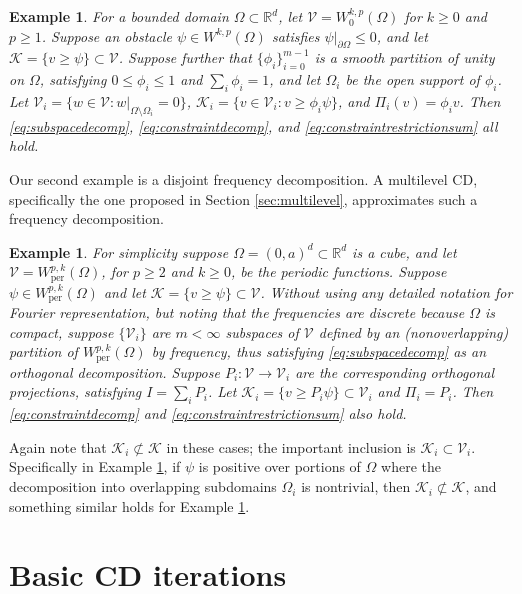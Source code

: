 \documentclass[letterpaper,final,12pt,reqno]{amsart}
\theoremstyle{cstyle}
\theoremstyle{cstyle*}
\theoremstyle{dstyle}
\newtheorem{example}[theorem]{Example}
\numberwithin{equation}{section}
\numberwithin{figure}{section}
\numberwithin{table}{section}
\numberwithin{theorem}{section}
\newcommand{\RR}{\mathbb{R}}
\newcommand{\cK}{\mathcal{K}}
\newcommand{\cV}{\mathcal{V}}
\begin{document}
\begin{example}  \label{ex:domaindecomposition}  For a bounded domain $\Omega \subset \RR^d$, let $\cV = W_0^{k,p}(\Omega)$ for $k\ge 0$ and $p\ge 1$.  Suppose an obstacle $\psi \in W^{k,p}(\Omega)$ satisfies $\psi|_{\partial \Omega} \le 0$, and let $\cK = \{v \ge \psi\} \subset \cV$.  Suppose further that $\{\phi_i\}_{i=0}^{m-1}$ is a smooth partition of unity on $\Omega$, satisfying $0 \le \phi_i\le 1$ and $\sum_i \phi_i = 1$, and let $\Omega_i$ be the open support of $\phi_i$.  Let $\cV_i = \{w \in \cV:w|_{\Omega \setminus \Omega_i} =0 \}$, $\cK_i = \{v \in \cV_i: v \ge \phi_i \psi\}$, and $\Pi_i(v) = \phi_i v$.  Then \eqref{eq:subspacedecomp}, \eqref{eq:constraintdecomp}, and \eqref{eq:constraintrestrictionsum} all hold.
\end{example}

Our second example is a disjoint frequency decomposition.  A multilevel CD, specifically the one proposed in Section \ref{sec:multilevel}, approximates such a frequency decomposition.

\begin{example}  \label{ex:frequencydecomposition}  For simplicity suppose $\Omega = (0,a)^d \subset \RR^d$ is a cube, and let $\cV = W_{\text{per}}^{p,k}(\Omega)$, for $p\ge 2$ and $k\ge 0$, be the periodic functions.  Suppose $\psi \in W_{\text{per}}^{p,k}(\Omega)$ and let $\cK = \{v \ge \psi\} \subset \cV$.  Without using any detailed notation for Fourier representation, but noting that the frequencies are discrete because $\Omega$ is compact, suppose $\{\cV_i\}$ are $m<\infty$ subspaces of $\cV$ defined by an (nonoverlapping) partition of $W_{\text{per}}^{p,k}(\Omega)$ by frequency, thus satisfying \eqref{eq:subspacedecomp} as an orthogonal decomposition.  Suppose $P_i:\cV \to \cV_i$ are the corresponding orthogonal projections, satisfying $I = \sum_i P_i$.  Let $\cK_i = \{v \ge P_i \psi\} \subset \cV_i$ and $\Pi_i = P_i$.  Then \eqref{eq:constraintdecomp} and \eqref{eq:constraintrestrictionsum} also hold.
\end{example}

Again note that $\cK_i \not\subset \cK$ in these cases; the important inclusion is $\cK_i \subset \cV_i$.  Specifically in Example \ref{ex:domaindecomposition}, if $\psi$ is positive over portions of $\Omega$ where the decomposition into overlapping subdomains $\Omega_i$ is nontrivial, then $\cK_i \not\subset \cK$, and something similar holds for Example \ref{ex:frequencydecomposition}.


\section{Basic CD iterations} \label{sec:cditers}
\end{document}
